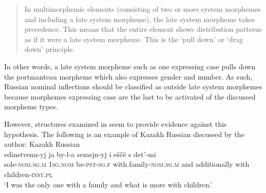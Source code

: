 \begin{quote}In multimorphemic elements (consisting of two or more system morphemes and including a late system morpheme), the late system morpheme takes precedence. This means that the entire element shows distribution patterns as if it were a late system morpheme. This is the `pull down' or `drag down' principle.
\end{quote}
In other words, a late system morpheme such as one expressing case pulls down the portmanteau morpheme which also expresses gender and number. As such, Russian nominal inflections should be classified as outside late system morphemes because morphemes expressing case are the last to be activated of the discussed morpheme types.

However, structures examined in \citet{muhamedowa-untersuchung-2006} seem to provide evidence against this hypothesis. The following is an example of Kazakh Russian discussed by the author:
\ea \label{ex:1:15}
Kazakh Russian \citep[92]{muhamedowa-untersuchung-2006}\\
\gll edinstvenn-yj ja by-l-a semejn-yj i eščë s det'-mi\\
	sole-\textsc{nom.sg.m} \textsc{1sg.nom} be-\textsc{pst-sg.f} with.family-\textsc{nom.sg.m} and additionally with children-\textsc{inst.pl}\\
\glt `I was the only one with a family and what is more with children.'
\z

